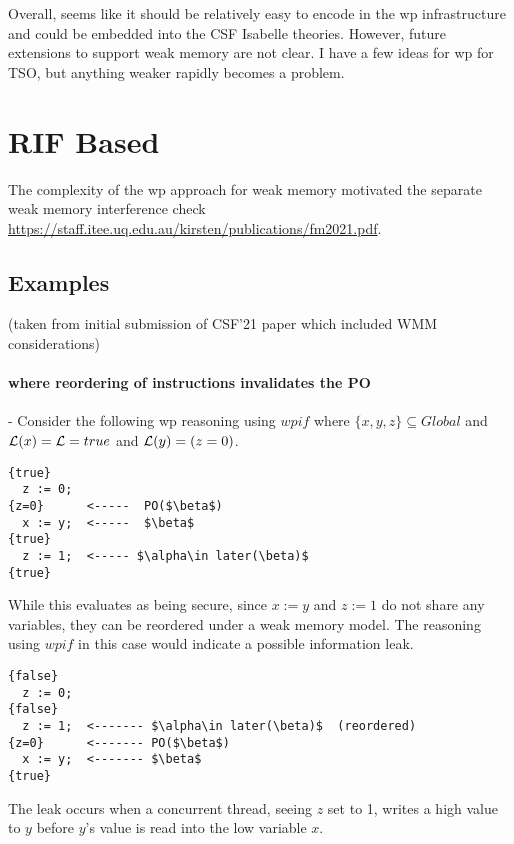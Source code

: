 Overall, seems like it should be relatively easy to encode in the wp infrastructure and could be embedded into the CSF Isabelle theories. However, future extensions to support weak memory are not clear. I have a few ideas for wp for TSO, but anything weaker rapidly becomes a problem.

\section{RIF Based}

The complexity of the wp approach for weak memory motivated the
separate weak memory interference check
\url{https://staff.itee.uq.edu.au/kirsten/publications/fm2021.pdf}.


\subsection{Examples}
 
  (taken from initial submission of CSF'21 paper which included WMM considerations)

\paragraph{where reordering of instructions invalidates the PO}
-  Consider the following wp reasoning using $wpi\!f$ where $\{x,y,z\}\subseteq Global$ and
$\mathcal{L}(x)=\mathcal{L}=true$ and $\mathcal{L}(y)= (z=0)$.


\begin{lstlisting}
{true}
  z := 0;
{z=0}      <-----  PO($\beta$)
  x := y;  <-----  $\beta$ 
{true}
  z := 1;  <----- $\alpha\in later(\beta)$
{true}
\end{lstlisting}


While this evaluates as being secure, since $x:=y$ and $z:=1$ do not
share any variables, they can be reordered under a weak memory
model. The reasoning using $wpi\!f$ in this case would indicate a
possible information leak. 

\begin{lstlisting}
{false}
  z := 0;
{false}
  z := 1;  <------- $\alpha\in later(\beta)$  (reordered)
{z=0}      <------- PO($\beta$)
  x := y;  <------- $\beta$
{true}
\end{lstlisting}
The leak occurs when a concurrent thread, seeing $z$ set to 1, writes a high value to $y$ before $y$'s value is read into the low variable $x$.



